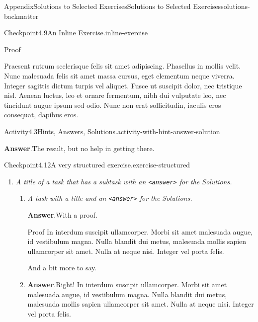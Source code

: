 \documentclass[twoside,10pt,]{article}
\newcommand{\blocktitlefont}{\relax}
\newcommand{\mono}[1]{\texttt{#1}}
\newcommand{\lititle}[1]{{\slshape#1}}
\numberwithin{equation}{section}
\begin{document}
\begin{solutions-section}{Appendix}{Solutions to Selected Exercises}{}{Solutions to Selected Exercises}{}{}{solutions-backmatter}
\begin{inlinesolution}{Checkpoint}{4.9}{An Inline Exercise.}{inline-exercise}
\begin{solutionproof}{Proof}
\par
Praesent rutrum scelerisque felis sit amet adipiscing. Phasellus in mollis velit. Nunc malesuada felis sit amet massa cursus, eget elementum neque viverra. Integer sagittis dictum turpis vel aliquet. Fusce ut suscipit dolor, nec tristique nisl. Aenean luctus, leo et ornare fermentum, nibh dui vulputate leo, nec tincidunt augue ipsum sed odio. Nunc non erat sollicitudin, iaculis eros consequat, dapibus eros.%
\end{solutionproof}
\end{inlinesolution}%
\begin{activitysolution}{Activity}{4.3}{Hints, Answers, Solutions.}{activity-with-hint-answer-solution}%
\par\smallskip%
\noindent\textbf{\blocktitlefont Answer}.\hypertarget{activity-with-hint-answer-solution-5-back}{}\quad{}The result, but no help in getting there.%
\end{activitysolution}%
\begin{inlinesolution}{Checkpoint}{4.12}{A very structured exercise.}{exercise-structured}%
\begin{enumerate}[font=\bfseries,label=(\alph*),ref=\alph*]%
\item[(c)]\lititle{A title of a task that has a subtask with an \mono{<answer>} for the Solutions.}\par%
\begin{enumerate}[font=\bfseries,label=(\roman*),ref=\theenumi.\roman*]%
\item[(i)]\lititle{A task with a title and an \mono{<answer>} for the Solutions.}\par%
\par\smallskip%
\noindent\textbf{\blocktitlefont Answer}.\hypertarget{exercise-structured-5-3-3-back}{}\quad{}With a proof.%
\begin{solutionproof}{Proof}
In interdum suscipit ullamcorper. Morbi sit amet malesuada augue, id vestibulum magna. Nulla blandit dui metus, malesuada mollis sapien ullamcorper sit amet. Nulla at neque nisi. Integer vel porta felis.%
\end{solutionproof}
And a bit more to say.%
\item[(ii)]\noindent\textbf{\blocktitlefont Answer}.\hypertarget{exercise-structured-5-4-2-back}{}\quad{}Right!  In interdum suscipit ullamcorper. Morbi sit amet malesuada augue, id vestibulum magna. Nulla blandit dui metus, malesuada mollis sapien ullamcorper sit amet. Nulla at neque nisi. Integer vel porta felis.%
\end{enumerate}%

\end{enumerate}
\end{inlinesolution}
\end{solutions-section}
\end{document}
